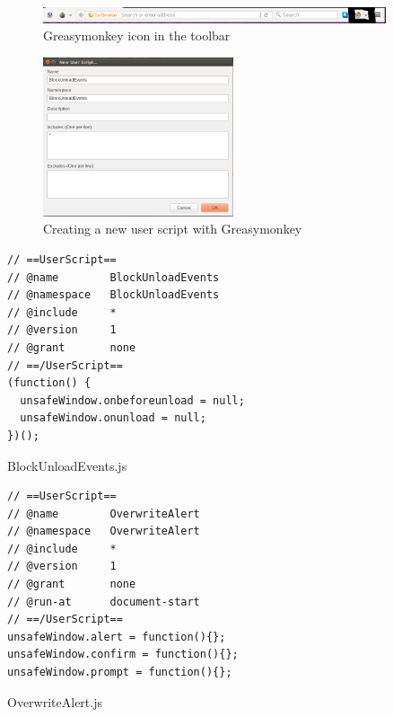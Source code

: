 \begin{figure}[h]
  \centering
    \includegraphics[width=0.9\textwidth]{pictures/greasymonkey-icon.png}
  \caption{Greasymonkey icon in the toolbar}
  \label{fig:greasymonkey_icon}
\end{figure}

\begin{figure}[h]
  \centering
    \includegraphics[width=0.5\textwidth]{pictures/greasymonkey-script.png}
  \caption{Creating a new user script with Greasymonkey}
  \label{fig:greasymonkey_script}
\end{figure}

\newpage
\begin{listing}
\begin{verbatim}
// ==UserScript==
// @name        BlockUnloadEvents
// @namespace   BlockUnloadEvents
// @include     *
// @version     1
// @grant       none
// ==/UserScript==
(function() {
  unsafeWindow.onbeforeunload = null;
  unsafeWindow.onunload = null;
})();
\end{verbatim}
\caption{BlockUnloadEvents.js}
\end{listing}

\begin{listing}
\begin{verbatim}
// ==UserScript==
// @name        OverwriteAlert
// @namespace   OverwriteAlert
// @include     *
// @version     1
// @grant       none
// @run-at      document-start
// ==/UserScript==
unsafeWindow.alert = function(){};
unsafeWindow.confirm = function(){};
unsafeWindow.prompt = function(){};
\end{verbatim}
\caption{OverwriteAlert.js}
\end{listing}
